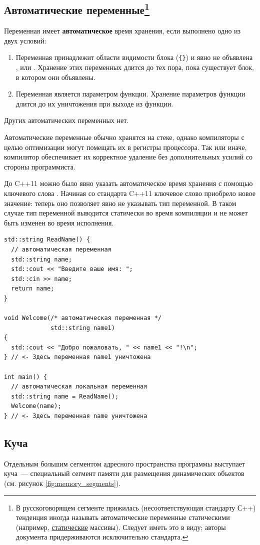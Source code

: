 \subsection{Автоматические переменные\footnote{В русскоговорящем сегменте прижилась (несоответствующая стандарту С++) тенденция иногда называть
автоматические переменные статическими (например, \underline{статические} массивы). Следует иметь это в виду; авторы документа придерживаются
исключительно стандарта.}}
Переменная имеет \textbf{автоматическое} время хранения, если выполнено одно из двух условий:
\label{def:auto_storage}
\begin{enumerate}
  \item Переменная принадлежит области видимости блока (\verb|{}|) и явно не объявлена ,  или .
  Хранение этих переменных длится до тех пора, пока существует блок, в котором они объявлены.
  \item Переменная является параметром функции. Хранение параметров функции длится до их уничтожения при выходе из функции.
\end{enumerate}
Других автоматических переменных нет.

Автоматические переменные обычно хранятся на стеке, однако компиляторы с целью
оптимизации могут помещать их в регистры процессора. Так или иначе, компилятор обеспечивает их
корректное удаление без дополнительных усилий со стороны программиста.

До C++11 можно было явно указать автоматическое время хранения с помощью
ключевого слова . Начиная со стандарта C++11 ключевое слово
 приобрело новое значение: теперь оно позволяет явно не указывать
тип переменной. В таком случае тип переменной выводится статически во время
компиляции и не может быть изменен во время исполнения.
\begin{verbatim}
std::string ReadName() {
  // автоматическая переменная
  std::string name;
  std::cout << "Введите ваше имя: ";
  std::cin >> name;
  return name;
}

void Welcome(/* автоматическая переменная */
             std::string name1)
{
  std::cout << "Добро пожаловать, " << name1 << "!\n";
} // <- Здесь переменная name1 уничтожена

int main() {
  // автоматическая локальная переменная
  std::string name = ReadName();
  Welcome(name);
} // <- Здесь переменная name уничтожена
\end{verbatim}

\subsection{Куча}
Отдельным большим сегментом адресного пространства программы выступает куча~--- специальный сегмент памяти для размещения динамических объектов (см. рисунок \ref{fig:memory_segments}).


